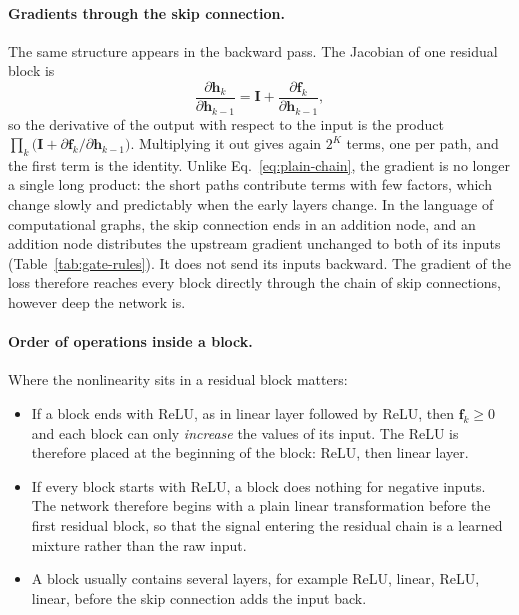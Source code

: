 \paragraph{Gradients through the skip connection.}
The same structure appears in the backward pass. The Jacobian of one residual
block is
\begin{equation}
  \frac{\partial \mathbf{h}_k}{\partial \mathbf{h}_{k-1}}
  = \mathbf{I} + \frac{\partial \mathbf{f}_k}{\partial \mathbf{h}_{k-1}} ,
\end{equation}
so the derivative of the output with respect to the input is the product
$\prod_k \bigl(\mathbf{I} + \partial \mathbf{f}_k/\partial \mathbf{h}_{k-1}\bigr)$.
Multiplying it out gives again $2^K$ terms, one per path, and the first term is
the identity. Unlike Eq.~\eqref{eq:plain-chain}, the gradient is no longer a
single long product: the short paths contribute terms with few factors, which
change slowly and predictably when the early layers change. In the language of
computational graphs, the skip connection ends in an addition node, and an
addition node distributes the upstream gradient unchanged to both of its inputs
(Table~\ref{tab:gate-rules}). It does not send its inputs backward. The gradient
of the loss therefore reaches every block directly through the chain of skip
connections, however deep the network is.

\paragraph{Order of operations inside a block.}
Where the nonlinearity sits in a residual block matters:
\begin{itemize}
  \item If a block ends with ReLU, as in linear layer followed by ReLU, then
        $\mathbf{f}_k \ge 0$ and each block can only \emph{increase} the values
        of its input. The ReLU is therefore placed at the beginning of the
        block: ReLU, then linear layer.
  \item If every block starts with ReLU, a block does nothing for negative
        inputs. The network therefore begins with a plain linear transformation
        before the first residual block, so that the signal entering the
        residual chain is a learned mixture rather than the raw input.
  \item A block usually contains several layers, for example ReLU, linear,
        ReLU, linear, before the skip connection adds the input back.
\end{itemize}

